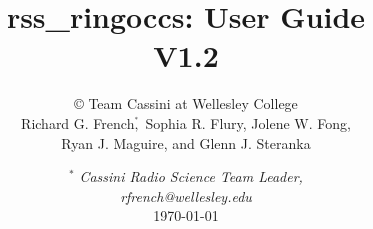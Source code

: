 \documentclass[titlepage, 12pt]{article}
\begin{document}
    \title{{\Huge{rss\_ringoccs: User Guide}\\}V1.2}
    \author{\copyright
            Team Cassini at Wellesley College\\
            Richard G. French$\overset{^*}{,}$
            Sophia R. Flury,
            Jolene W. Fong,\\
            Ryan J. Maguire, and
            Glenn J. Steranka}
    \date{%
        $^*$\textit{%
            \small{Cassini Radio Science Team Leader, \\
            rfrench@wellesley.edu}
        }\\[4ex]%
        \today%
    }
    \maketitle
    \newpage
    \tableofcontents
    \newpage
    \listoffigures
    \listoftables
    \clearpage
\end{document}

